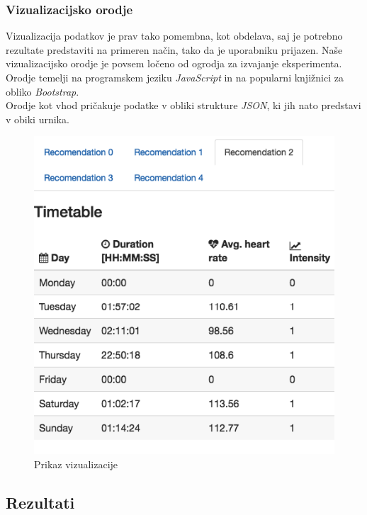 \documentclass{acm_proc_article-sp}
\begin{document}
\subsubsection{Vizualizacijsko orodje}
Vizualizacija podatkov je prav tako pomembna, kot obdelava, saj je potrebno rezultate predstaviti na primeren način, tako da je uporabniku prijazen. Naše vizualizacijsko orodje je povsem ločeno od ogrodja za izvajanje eksperimenta. Orodje temelji na programskem jeziku \textit{JavaScript} in na popularni knjižnici za obliko \textit{Bootstrap}.\\
Orodje kot vhod pričakuje podatke v obliki strukture \textit{JSON}, ki jih nato predstavi v obiki urnika.\\ 


\begin{figure}
 \centering
 \includegraphics[width=\linewidth]{vizualization}
 \caption{Prikaz vizualizacije}
\end{figure}


\subsection{Rezultati}
\end{document}
